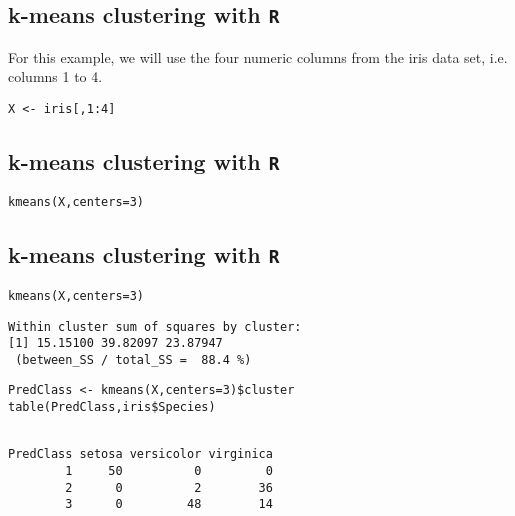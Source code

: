 \documentclass[]{article}
\begin{document}


\subsection{k-means clustering with \texttt{R}}

For this example, we will use the four numeric columns from the iris data set, i.e. columns 1 to 4.
\begin{framed}
\begin{verbatim}
X <- iris[,1:4]
\end{verbatim}
\end{framed}




\subsection{k-means clustering with \texttt{R}}

\begin{framed}
\begin{verbatim}
kmeans(X,centers=3)
\end{verbatim}
\end{framed}




\subsection{k-means clustering with \texttt{R}}

\begin{framed}
\begin{verbatim}
kmeans(X,centers=3)
\end{verbatim}
\end{framed}
\begin{verbatim}
Within cluster sum of squares by cluster:
[1] 15.15100 39.82097 23.87947
 (between_SS / total_SS =  88.4 %)
\end{verbatim}


\Large
\begin{framed}
\begin{verbatim}
PredClass <- kmeans(X,centers=3)$cluster
table(PredClass,iris$Species)
\end{verbatim}
\end{framed}
\begin{verbatim}
        
PredClass setosa versicolor virginica
        1     50          0         0
        2      0          2        36
        3      0         48        14

\end{verbatim}
\end{document}
